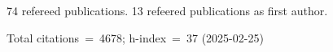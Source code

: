 74 refereed publications. 13 refeered publications as first author.

Total citations~=~4678; h-index~=~37 (2025-02-25)
